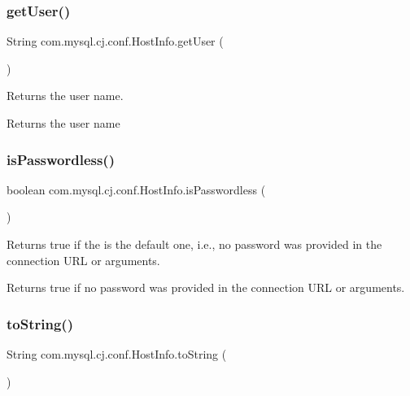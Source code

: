 \subsubsection{\texorpdfstring{get\+User()}{getUser()}}
{\footnotesize\ttfamily String com.\+mysql.\+cj.\+conf.\+Host\+Info.\+get\+User (\begin{DoxyParamCaption}{ }\end{DoxyParamCaption})}

Returns the user name.

\begin{DoxyReturn}{Returns}
the user name 
\end{DoxyReturn}
\mbox{\label{classcom_1_1mysql_1_1cj_1_1conf_1_1_host_info_a6bb33f0cf17ac943b76138e3813898da}} 
\subsubsection{\texorpdfstring{is\+Passwordless()}{isPasswordless()}}
{\footnotesize\ttfamily boolean com.\+mysql.\+cj.\+conf.\+Host\+Info.\+is\+Passwordless (\begin{DoxyParamCaption}{ }\end{DoxyParamCaption})}

Returns true if the is the default one, i.\+e., no password was provided in the connection U\+RL or arguments.

\begin{DoxyReturn}{Returns}
true if no password was provided in the connection U\+RL or arguments. 
\end{DoxyReturn}
\mbox{\label{classcom_1_1mysql_1_1cj_1_1conf_1_1_host_info_ac3d7e44e2787c35c23b99127865233c0}} 
\subsubsection{\texorpdfstring{to\+String()}{toString()}}
{\footnotesize\ttfamily String com.\+mysql.\+cj.\+conf.\+Host\+Info.\+to\+String (\begin{DoxyParamCaption}{ }\end{DoxyParamCaption})}

